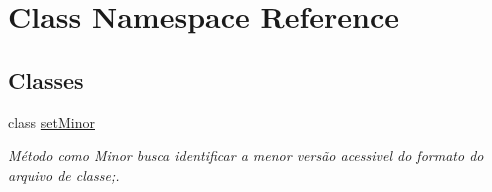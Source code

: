 \hypertarget{namespace_class}{}\section{Class Namespace Reference}
\label{namespace_class}
\subsection*{Classes}
\begin{DoxyCompactItemize}
\item 
class \hyperlink{class_class_1_1set_minor}{set\+Minor}
\begin{DoxyCompactList}\small\item\em Método como Minor busca identificar a menor versão acessivel do formato do arquivo de classe;. \end{DoxyCompactList}\end{DoxyCompactItemize}
